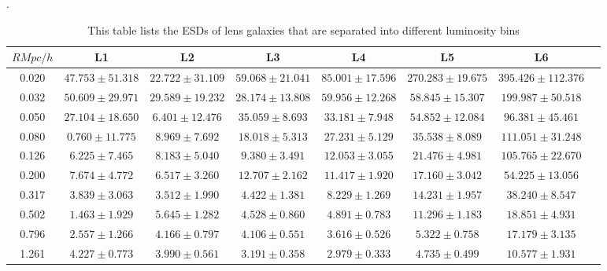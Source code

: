\documentclass[apj]{emulateapj}
\begin{document}
\begin{table}[h!]
\begin{center}
 \caption{\label{tab:ESD-L6} This table lists the ESDs of lens
   galaxies that are separated into different luminosity bins}.
\begin{tabular}{cccccccc}
\hline
$R Mpc/h$ & L1 & L2 & L3 & L4 & L5 & L6 \\
\hline
0.020 & $47.753 \pm 51.318$  & $22.722 \pm 31.109$   & $59.068 \pm 21.041$    & $85.001 \pm 17.596$  & $270.283 \pm 19.675$   & $395.426 \pm 112.376$  \\
0.032 & $50.609 \pm 29.971$  & $29.589 \pm 19.232$   & $28.174 \pm 13.808$    & $59.956 \pm 12.268$  & $58.845  \pm 15.307$   & $199.987 \pm 50.518 $  \\
0.050 & $27.104 \pm 18.650$  & $6.401  \pm 12.476$   & $35.059 \pm 8.693 $    & $33.181 \pm 7.948 $  & $54.852  \pm 12.084$   & $96.381  \pm 45.461 $  \\
0.080 & $0.760  \pm 11.775$  & $8.969  \pm 7.692 $   & $18.018 \pm 5.313 $    & $27.231 \pm 5.129 $  & $35.538  \pm 8.089 $   & $111.051 \pm 31.248 $  \\
0.126 & $6.225  \pm 7.465 $  & $8.183  \pm 5.040 $   & $9.380  \pm 3.491 $    & $12.053 \pm 3.055 $  & $21.476  \pm 4.981 $   & $105.765 \pm 22.670 $  \\
0.200 & $7.674  \pm 4.772 $  & $6.517  \pm 3.260 $   & $12.707 \pm 2.162 $    & $11.417 \pm 1.920 $  & $17.160  \pm 3.042 $   & $54.225  \pm 13.056 $  \\
0.317 & $3.839  \pm 3.063 $  & $3.512  \pm 1.990 $   & $4.422  \pm 1.381 $    & $8.229  \pm 1.269 $  & $14.231  \pm 1.957 $   & $38.240  \pm 8.547  $  \\
0.502 & $1.463  \pm 1.929 $  & $5.645  \pm 1.282 $   & $4.528  \pm 0.860 $    & $4.891  \pm 0.783 $  & $11.296  \pm 1.183 $   & $18.851  \pm 4.931  $  \\
0.796 & $2.557  \pm 1.266 $  & $4.166  \pm 0.797 $   & $4.106  \pm 0.551 $    & $3.616  \pm 0.526 $  & $5.322   \pm 0.758 $   & $17.179  \pm 3.135  $  \\
1.261 & $4.227  \pm 0.773 $  & $3.990  \pm 0.561 $   & $3.191  \pm 0.358 $    & $2.979  \pm 0.333 $  & $4.735   \pm 0.499 $   & $10.577  \pm 1.931  $  \\
\hline
\end{tabular}
\end{center}
\end{table}
 
\end{document}
